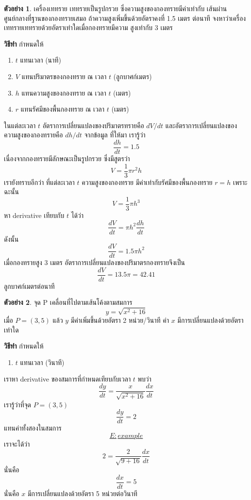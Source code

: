 \documentclass[
]{book}
\providecommand{\tightlist}{%
  \setlength{\itemsep}{0pt}\setlength{\parskip}{0pt}}
\theoremstyle{definition}
\theoremstyle{definition}
\newtheorem{example}{ตัวอย่าง}[chapter]
\theoremstyle{definition}
\theoremstyle{definition}
\theoremstyle{remark}
\begin{document}
\begin{example}
เครื่องเททราย เททรายเป็นรูปกรวย ซึ่งความสูงของกองทรายมีค่าเท่ากับ
เส้นผ่านศูนย์กลางที่ฐานของกองทรายเสมอ ถ้าความสูงเพิ่มขึ้นด้วยอัตราคงที่ 1.5 เมตร ต่อนาที
จงหาว่าเครื่องเททรายเททรายด้วยอัตราเท่าใดเมื่อกองทรายมีความ สูงเท่ากับ 3 เมตร
\end{example}

\textbf{วิธีทำ} กำหนดให้

\begin{enumerate}
\def\labelenumi{\arabic{enumi}.}
\item
  \(t\) แทนเวลา (นาที)
\item
  \(V\) แทนปริมาตรของกองทราย ณ เวลา \(t\) (ลูกบาศก์เมตร)
\item
  \(h\) แทนความสูงของกองทราย ณ เวลา \(t\) (เมตร)
\item
  \(r\) แทนรัศมีของพื้นกองทราย ณ เวลา \(t\) (เมตร)
\end{enumerate}

ในแต่ละเวลา \(t\) อัตราการเปลี่ยนแปลงของปริมาตรทรายคือ \(dV/dt\)
และอัตราการเปลี่ยนแปลงของความสูงของกองทรายคือ \(dh/dt\) จากข้อมูล ที่ให้มา เรารู้ว่า
\[\frac{dh}{dt} = 1.5\] เนื่องจากกองทรายมีลักษณะเป็นรูปกรวย ซึ่งมีสูตรว่า
\[V = \frac{1}{3}\pi r^2h\] เรายังทราบอีกว่า ที่แต่ละเวลา \(t\) ความสูงของกองทราย
มีค่าเท่ากับรัศมีของพื้นกองทราย \(r=h\) เพราะฉะนั้น \[V = \frac{1}{3}\pi h^3\] หา
derivative เทียบกับ \(t\) ได้ว่า \[\frac{dV}{dt} = \pi h^2\frac{dh}{dt}\] ดังนั้น
\[\frac{dV}{dt} = 1.5\pi h^2\] เมื่อกองทรายสูง 3 เมตร
อัตราการเปลี่ยนแปลงของปริมาตรกองทรายจึงเป็น
\[\frac{dV}{dt} = 13.5\pi = 42.41\] ลูกบาศก์เมตรต่อนาที

\begin{example}
จุด P เคลื่อนที่ไปตามเส้นโค้งตามสมการ \[y = \sqrt{x^2+16}\] เมื่อ \(P = (3,5)\) แล้ว
\(y\) มีค่าเพิ่มขึ้นด้วยอัตรา 2 หน่วย/วินาที ค่า \(x\) มีการเปลี่ยนแปลงด้วยอัตราเท่าใด
\end{example}

\textbf{วิธีทำ} กำหนดให้

\begin{enumerate}
\def\labelenumi{\arabic{enumi}.}
\tightlist
\item
  \(t\) แทนเวลา (วินาที)
\end{enumerate}

เราหา derivative ของสมการที่กำหนดเทียบกับเวลา \(t\) พบว่า \[\label{E:example}
    \frac{dy}{dt} = \frac{x}{\sqrt{x^2+16}}\frac{dx}{dt}\] เรารู้ว่าที่จุด
\(P = (3,5)\) \[\frac{dy}{dt} = 2\]
แทนค่าทั้งสองในสมการ~\hyperref[E:example]{\[E:example\]} เราจะได้ว่า
\[2 = \frac{2}{\sqrt{9+16}}\frac{dx}{dt}\] นั่นคือ \[\frac{dx}{dt} = 5\]
นั่นคือ \(x\) มีการเปลี่ยนแปลงด้วยอัตรา 5 หน่วยต่อวินาที
\end{document}
